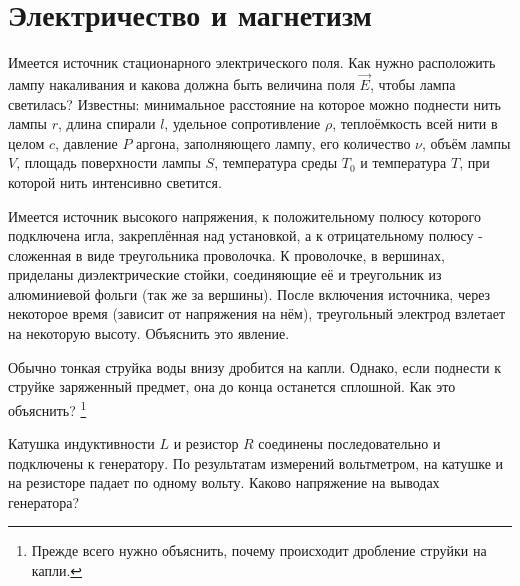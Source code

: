 \chapter{Электричество и магнетизм}
\thispagestyle{empty}
\clearpage
\begin{problem}
Имеется источник стационарного электрического поля. Как нужно расположить лампу накаливания и какова должна быть величина поля $\vec{E}$, чтобы лампа светилась? Известны: минимальное расстояние на которое можно поднести нить лампы $r$, длина спирали $l$, удельное сопротивление $\rho$, теплоёмкость всей нити в целом $c$, давление $P$ аргона, заполняющего лампу, его количество $\nu$, объём лампы $V$, площадь поверхности лампы $S$, температура среды $T_0$ и температура $T$, при которой нить интенсивно светится.
\end{problem}
\begin{problem}
Имеется источник высокого напряжения, к положительному полюсу которого подключена игла, закреплённая над установкой, а к отрицательному полюсу - сложенная в виде треугольника проволочка. К проволочке, в вершинах, приделаны диэлектрические стойки, соединяющие её и треугольник из алюминиевой фольги (так же за вершины). После включения источника, через некоторое время (зависит от напряжения на нём), треугольный электрод взлетает на некоторую высоту. Объяснить это явление.
\end{problem}
\begin{problem}
Обычно тонкая струйка воды внизу дробится на капли. Однако, если поднести к струйке заряженный предмет, она до конца останется сплошной. Как это объяснить?
\footnote{Прежде всего нужно объяснить, почему происходит дробление струйки на капли.}
\end{problem}
\begin{problem}
Катушка индуктивности $L$ и резистор $R$ соединены последовательно и подключены к генератору. По результатам измерений вольтметром, на катушке и на резисторе падает по одному вольту. Каково напряжение на выводах генератора?
\end{problem}